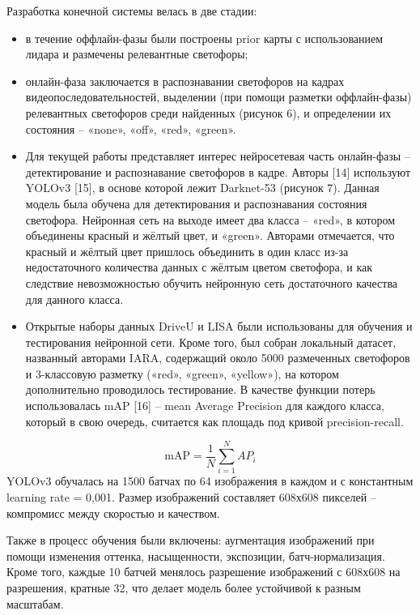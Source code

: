 \documentclass{misisarticle}
\begin{document}
Разработка конечной системы велась в две стадии:

\begin{itemize}
  \item в течение оффлайн-фазы были построены prior карты с использованием лидара и размечены релевантные светофоры;
  \item онлайн-фаза заключается в распознавании светофоров на кадрах видеопоследовательностей, выделении (при помощи разметки оффлайн-фазы) релевантных светофоров среди найденных (рисунок 6), и определении их состояния – «none», «off», «red», «green».
  \item Для текущей работы представляет интерес нейросетевая часть онлайн-фазы – детектирование и распознавание светофоров в кадре. Авторы [14] используют YOLOv3 [15], в основе которой лежит Darknet-53 (рисунок 7). Данная модель была обучена для детектирования и распознавания состояния светофора. Нейронная сеть на выходе имеет два класса – «red», в котором объединены красный и жёлтый цвет, и «green». Авторами отмечается, что красный и жёлтый цвет пришлось объединить в один класс из-за недостаточного количества данных с жёлтым цветом светофора, и как следствие невозможностью обучить нейронную сеть достаточного качества для данного класса.
  \item Открытые наборы данных DriveU и LISA были использованы для обучения и тестирования нейронной сети. Кроме того, был собран локальный датасет, названный авторами IARA, содержащий около 5000 размеченных светофоров и 3-классовую разметку («red», «green», «yellow»), на котором дополнительно проводилось тестирование. В качестве функции потерь использовалась mAP [16] – mean Average Precision для каждого класса, который в свою очередь, считается как площадь под кривой precision-recall.
\end{itemize}
\begin{equation}
  \label{eq:map}
  \mathrm{mAP} = \frac{1}{N}\sum_{i=1}^{N} AP_i
\end{equation}
YOLOv3 обучалась на 1500 батчах по 64 изображения в каждом и с константным learning rate = 0{,}001. Размер изображений составляет 608х608 пикселей – компромисс между скоростью и качеством.

Также в процесс обучения были включены: аугментация изображений при помощи изменения оттенка, насыщенности, экспозиции, батч-нормализация. Кроме того, каждые 10 батчей менялось разрешение изображений с 608х608 на разрешения, кратные 32, что делает модель более устойчивой к разным масштабам.
\end{document}

